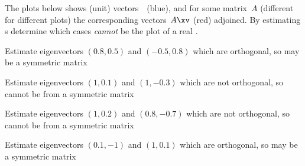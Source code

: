 \begin{example} \label{eg:}
The plots below shows (unit) vectors~\xv\ (blue), and for some matrix~\(A\) (different for different plots) the corresponding vectors~\(A\xv\) (red) adjoined. 
By estimating s determine which cases \emph{cannot} be the plot of a real .
\begin{parts}

\item {}
\begin{solution} 
Estimate eigenvectors \((0.8,0.5)\) and \((-0.5,0.8)\) which are  orthogonal, so may be a symmetric matrix 
\end{solution}


\item {}
\begin{solution} 
Estimate eigenvectors \((1,0.1)\) and \((1,-0.3)\) which are not orthogonal, so cannot be from a symmetric matrix 
\end{solution}

\item {}
\begin{solution} 
Estimate eigenvectors \((1,0.2)\) and \((0.8,-0.7)\) which are not orthogonal, so cannot be from a symmetric matrix 
\end{solution}

\item {}
\begin{solution} 
Estimate eigenvectors \((0.1,-1)\) and \((1,0.1)\) which are orthogonal, so may be a symmetric matrix 
\end{solution}

\end{parts}
\end{example}



